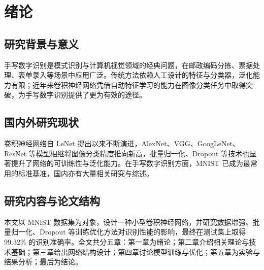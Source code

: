 \section{绪论}

\subsection{研究背景与意义}

手写数字识别是模式识别与计算机视觉领域的经典问题，在邮政编码分拣、票据处理、表单录入等场景中应用广泛。传统方法依赖人工设计的特征与分类器，泛化能力有限；近年来卷积神经网络凭借自动特征学习的能力在图像分类任务中取得突破\cite{lecun2015deep}，为手写数字识别提供了更为有效的途径。

\subsection{国内外研究现状}

卷积神经网络自 LeNet\cite{lecun1998gradient} 提出以来不断演进，AlexNet\cite{krizhevsky2012imagenet}、VGG\cite{simonyan2015very}、GoogLeNet\cite{szegedy2015going}、ResNet\cite{he2016deep} 等模型相继将图像分类精度推向新高，批量归一化\cite{ioffe2015batch}、Dropout\cite{srivastava2014dropout} 等技术也显著提升了网络的可训练性与泛化能力。在手写数字识别方面，MNIST\cite{deng2012mnist} 已成为最常用的标准基准，国内亦有大量相关研究与综述\cite{zhou2017cnn,li2016cnn}。

\subsection{研究内容与论文结构}

本文以 MNIST 数据集为对象，设计一种小型卷积神经网络，并研究数据增强、批量归一化、Dropout 等训练优化方法对识别性能的影响，最终在测试集上取得 99.32\% 的识别准确率。全文共分五章：第一章为绪论；第二章介绍相关理论与技术基础；第三章给出网络结构设计；第四章讨论模型训练与优化；第五章为实验与结果分析；最后为结论。
